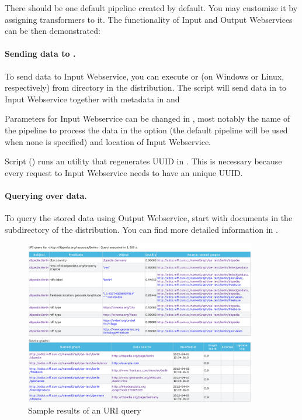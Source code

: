 There should be one default pipeline created by default. You may customize it by assigning transformers to it.
The functionality of Input and Output Webservices can be then demonstrated:

\paragraph{Sending data to \odcs.}
    To send data to Input Webservice, you can execute  or  (on Windows or Linux, respectively) from 
   directory  in the distribution. The script will send data in 
   to Input Webservice together with metadata in 
   and 
   
   Parameters for Input Webservice can be changed in 
   , most notably the name of the pipeline to 
   process the data in the  option (the default pipeline will be used when none is specified) and location of Input Webservice.
      
   Script  () runs an utility that regenerates UUID in
   . This is necessary because every request
   to Input Webservice needs to have an unique UUID.

\paragraph{Querying over data.} To query the stored data using Output Webservice, start with  documents in 
  the  subdirectory of the distribution. You can find more detailed information in .

\begin{figure}[hb]
    \centering
    \includegraphics[width=0.9\textwidth]{images/uri-query-screenshot.png}
    \caption{Sample results of an URI query}
    \label{fig:uriQuery}
\end{figure}

